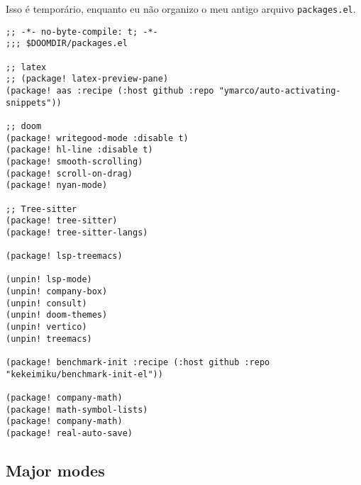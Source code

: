 \documentclass[11pt]{article}
\begin{document}
Isso é temporário, enquanto eu não organizo o meu antigo arquivo \texttt{packages.el}.
\begin{verbatim}
;; -*- no-byte-compile: t; -*-
;;; $DOOMDIR/packages.el

;; latex
;; (package! latex-preview-pane)
(package! aas :recipe (:host github :repo "ymarco/auto-activating-snippets"))

;; doom
(package! writegood-mode :disable t)
(package! hl-line :disable t)
(package! smooth-scrolling)
(package! scroll-on-drag)
(package! nyan-mode)

;; Tree-sitter
(package! tree-sitter)
(package! tree-sitter-langs)

(package! lsp-treemacs)

(unpin! lsp-mode)
(unpin! company-box)
(unpin! consult)
(unpin! doom-themes)
(unpin! vertico)
(unpin! treemacs)

(package! benchmark-init :recipe (:host github :repo "kekeimiku/benchmark-init-el"))

(package! company-math)
(package! math-symbol-lists)
(package! company-math)
(package! real-auto-save)
\end{verbatim}

\subsection{Major modes}
\label{sec:org4316566}
\end{document}
